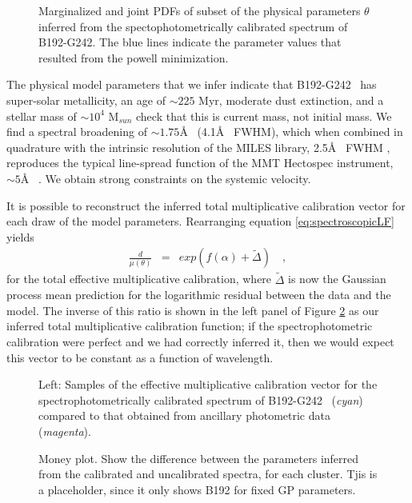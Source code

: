 \documentclass[iop,numberedappendix]{emulateapj}
\newcommand{\excluster}{B192-G242}
\begin{document}
\begin{figure}[h!]
\caption{ Marginalized and joint PDFs of subset of the physical
parameters $\theta$ inferred from the spectophotometrically calibrated
spectrum of \excluster. The blue lines indicate the parameter values
that resulted from the powell minimization.
\label{fig:inferred_params}}
\end{figure}

The physical model parameters that we infer indicate that \excluster~
has super-solar metallicity, an age of $\sim 225$ Myr, moderate dust
extinction, and a stellar mass of $\sim 10^{4}$ M$_{sun}$ {\color{blue}
check that this is current mass, not initial mass}.  We find a spectral
broadening of $\sim 1.75$\AA~ (4.1\AA~ FWHM), which when combined in
quadrature with the intrinsic resolution of the MILES library, 2.5\AA~
FWHM \citep{beifiori11}, reproduces the typical line-spread function
of the MMT Hectospec instrument, $\sim 5$\AA~ \citep{fabricant13}.
We obtain strong constraints on the systemic velocity.

It is possible to reconstruct the inferred total multiplicative
calibration vector for each draw of the model parameters.  Rearranging
equation \ref{eq:spectroscopicLF} yields
\begin{eqnarray} 
\frac{d}{\mu(\theta)} & = & exp(f(\alpha) + \tilde{\Delta})
\quad ,
\end{eqnarray}
for the total effective multiplicative calibration, where
$\tilde{\Delta}$ is now the Gaussian process mean prediction for the
logarithmic residual between the data and the model. The inverse of
this ratio is shown in the left panel of Figure
\ref{fig:inferred_calib} as our inferred total multiplicative
calibration function; if the spectrophotometric calibration were
perfect and we had correctly inferred it, then we would expect this
vector to be constant as a function of wavelength.


\begin{figure}[h!]
\caption{Left: Samples of the effective multiplicative calibration
vector for the spectrophotometrically calibrated spectrum of
\excluster~ ({\it cyan}) compared to that obtained from ancillary
photometric data ({\it magenta}).  
 \label{fig:inferred_calib}}
\end{figure}


\begin{figure}[h!]
\caption{Money plot.  Show the difference between the parameters
  inferred from the calibrated and uncalibrated spectra, for each
  cluster. Tjis is a placeholder, since it only shows B192 for fixed
  GP parameters. \label{fig:boom}}
\end{figure}
\end{document}
